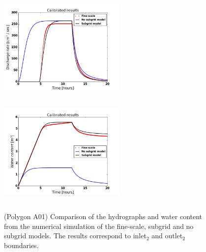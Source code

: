 \documentclass[review,11pt]{elsarticle}
\begin{document}
\begin{figure}[!h]
\centering
\includegraphics[width=6.2cm, height=5.5cm]{./figures/POLYGON_A01/POLYGON_A01dischargeCalibDDManning.png}
\includegraphics[width=6.2cm, height=5.5cm]{./figures/POLYGON_A01/POLYGON_A01watercontentCalibDDManning.png}
\caption{(Polygon A01) Comparison of the hydrographs and water content from the numerical simulation of the fine-scale, subgrid and no subgrid models. The results correspond to  inlet$_2$ and outlet$_2$ boundaries.}
\label{polygon-A01}
\end{figure}
\end{document}
